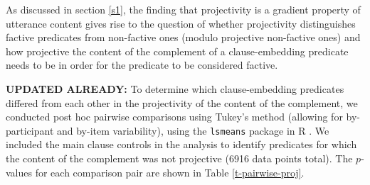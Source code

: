 \documentclass[11pt,fleqn]{article}
\newcommand{\6}{\mbox{$[\hspace*{-.6mm}[$}}
\newcommand{\9}{\mbox{$]\hspace*{-.6mm}]$}}
\begin{document}

As discussed in section \ref{s1}, the finding that projectivity is a gradient property of utterance content gives rise to the question of whether projectivity distinguishes factive predicates from non-factive ones (modulo projective non-factive ones) and how projective the content of the complement of a clause-embedding predicate needs to be in order for the predicate to be considered factive. 

{\bf UPDATED ALREADY: }
To determine which clause-embedding predicates differed from each other in the projectivity of the content of the  complement, we conducted post hoc pairwise comparisons using Tukey's method (allowing for by-participant and by-item variability), using the \verb|lsmeans| package \citep{tukey} in R \citep{r}. We included the main clause controls in the analysis to identify predicates for which the content of the complement was not projective (6916 data points total). The $p$-values for each comparison pair are shown in Table \ref{t-pairwise-proj}. 
\end{document}
